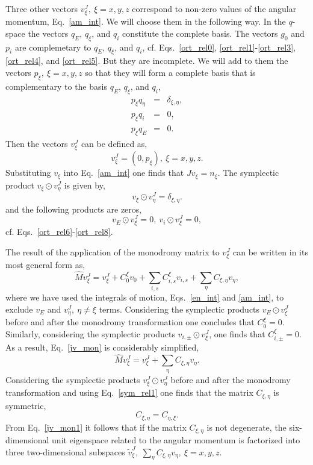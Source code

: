 \documentclass[journal=jpcafh,manuscript=article]{achemso}
\begin{document}
Three other vectors $v^J_\xi,\ \xi=x,y,z$ correspond to non-zero
values of the angular momentum, Eq.~\ref{am_int}. We will choose them
in the following way.  In the $q$-space the vectors $q_E$, $q_\xi$,
and $q_i$ constitute the complete basis. The vectors $g_0$ and $p_i$
are complemetary to $q_E$, $q_\xi$, and $q_i$,
cf. Eqs.~\ref{ort_rel0}, \ref{ort_rel1}-\ref{ort_rel3},
\ref{ort_rel4}, and \ref{ort_rel5}. But they are incomplete. We will
add to them the vectors $p_\xi,\ \xi=x,y,z$ so that they will form a 
complete basis that is complementary to the basis $q_E$, $q_\xi$,
and $q_i$,
\begin{eqnarray}
  \label{ort_rel6}
  p_\xi q_\eta&=&\delta_{\xi,\eta},
  \\
  \label{ort_rel7}
  p_\xi q_i    &=& 0,
  \\
  \label{ort_rel8}
  p_\xi q_E   &=& 0.
\end{eqnarray}
Then the vectors $v^J_\xi$ can be defined as,
\begin{equation}
  \label{am_dyn}
  v_\xi^J=(0, p_\xi),\ \xi=x,y,z.
\end{equation}
Substituting $v_\xi$ into Eq.~\ref{am_int} one finds that
$Jv_\xi=n_\xi$.  The symplectic product $v_\xi\odot v^J_\eta$ is given
by,
\begin{equation}
  \label{sym_rel1}
v_\xi\odot v^J_\eta=\delta_{\xi,\eta}.  
\end{equation}
and the following products are zeros,
\begin{equation}
  \label{sym_rel2}
v_E\odot v^J_\xi=0,\ v_i\odot v^J_\xi=0,
\end{equation}
cf. Eqs.~\ref{ort_rel6}-\ref{ort_rel8}.

The result of the application of the monodromy matrix to
$v^J_\xi$ can be written in its most general form as,
\begin{equation}
  \label{jv_mon}
  \hat{M}v_\xi^J= v_\xi^J + C_0^\xi v_0 + \sum_{i,s} C_{i,s}^\xi v_{i,s}
  +\sum_{\eta} C_{\xi,\eta} v_{\eta},
\end{equation}
where we have used the integrals of motion, Eqs.~\ref{en_int} and
\ref{am_int}, to exclude $v_E$ and $v_\eta^J,\ \eta\ne\xi$ terms.
Considering the symplectic products $v_E\odot v^J_\xi$ before and
after the monodromy transformation one concludes that
$C_0^\xi=0$. Similarly, considering the symplectic products
$v_{i,\pm}\odot v^J_\xi$, one finds that $C_{i,\pm}^\xi=0$.  As a
result, Eq.~\ref{jv_mon} is considerably simplified,
\begin{equation}
  \label{jv_mon1}
  \hat{M}v_\xi^J= v_\xi^J  +\sum_{\eta} C_{\xi,\eta} v_{\eta}. 
\end{equation}
Considering the symplectic products
$v_\xi^J\odot{v}^J_\eta$ before and after the monodromy
transformation and using Eq.~\ref{sym_rel1}
one finds that the matrix $C_{\xi,\eta}$ is symmetric,
\begin{equation}
  \label{sym_rel3}
  C_{\xi,\eta}=C_{\eta,\xi}.
\end{equation}
From Eq.~\ref{jv_mon1} it follows that if the matrix $C_{\xi,\eta}$
is not degenerate, the six-dimensional unit eigenspace related to the
angular momentum is factorized into three two-dimensional subspaces
$\tilde{v}_\xi^J,\ \sum_{\eta} C_{\xi,\eta} v_{\eta},\ \xi=x,y,z$.
\end{document}
